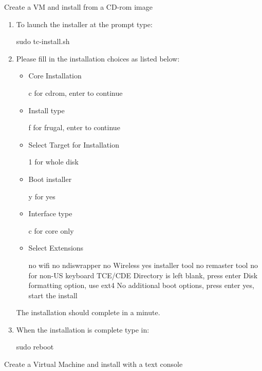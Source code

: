 \begin{Lab}
\begin{exe} {Create a VM and install from a CD-rom image}
\begin{enumerate}
			After the boot messages finish, the user friendly Tiny Core 
			command prompt will be visible. 
		\item To launch the installer at the prompt type: 
			\begin{raw}
sudo tc-install.sh 
			\end{raw}
		\item Please fill in the installation choices as listed below:
			\begin{itemize}
				\item Core Installation 
					\begin{raw}
c for cdrom, enter to continue 
					\end{raw}
				\item Install type 
					\begin{raw}
f for frugal, enter to continue 
					\end{raw}
				\item Select Target for Installation
					\begin{raw}
1 for whole disk 
					\end{raw}
				\item Boot installer 
					\begin{raw}
y for yes 
					\end{raw}
				\item Interface type 
					\begin{raw}
c for core only 
					\end{raw}
				\item Select Extensions 
					\begin{raw}
no wifi
no ndiswrapper
no Wireless 
yes installer tool 
no remaster tool 
no for non-US keyboard
TCE/CDE Directory is left blank, press enter 
Disk formatting option, use ext4
No additional boot options, press enter 
yes, start the install 
					\end{raw}
			\end{itemize}

			The installation should complete in a minute. 

		\item When the installation is complete type in: 
			\begin{raw}
sudo reboot 
			\end{raw} 
		\end{enumerate}

\end{exe}


\begin{exe}  {Create a Virtual Machine and install with a text console}
	

\end{exe}
\end{Lab}
